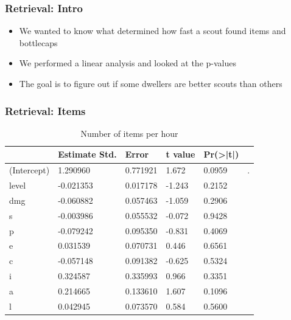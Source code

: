 \documentclass{beamer}
\begin{document}
\begin{frame}
  \frametitle{Retrieval: Intro}
  \begin{itemize}
  \item We wanted to know what determined how fast a scout found items and bottlecaps
  \item We performed a linear analysis and looked at the p-values
  \item The goal is to figure out if some dwellers are better scouts than others
  \end{itemize}

\end{frame}

\begin{frame}
  \frametitle{Retrieval: Items}
  \begin{table}
\caption{Number of items per hour}
\label{table:n.items}
\begin{tabular}{l|lllll}
&Estimate Std.&Error&t value&Pr(>|t|) &\\ 
\hline
(Intercept)&1.290960 &0.771921 &1.672&0.0959&.\\
level&-0.021353  & 0.017178 & -1.243 &  0.2152&  \\
dmg&-0.060882  & 0.057463 & -1.059 &  0.2906&  \\
s&-0.003986  & 0.055532 & -0.072  & 0.9428&  \\
p&-0.079242 &  0.095350 & -0.831 &  0.4069 & \\
e&0.031539 &  0.070731 &  0.446  & 0.6561&  \\
c& -0.057148  & 0.091382 & -0.625 &  0.5324&  \\
i&0.324587&0.335993&   0.966&   0.3351&  \\
a&0.214665&0.133610 &  1.607&   0.1096&  \\
l&0.042945&0.073570&0.584&0.5600&\\
\hline
\end{tabular}
\end{table}
\end{frame}
\end{document}
